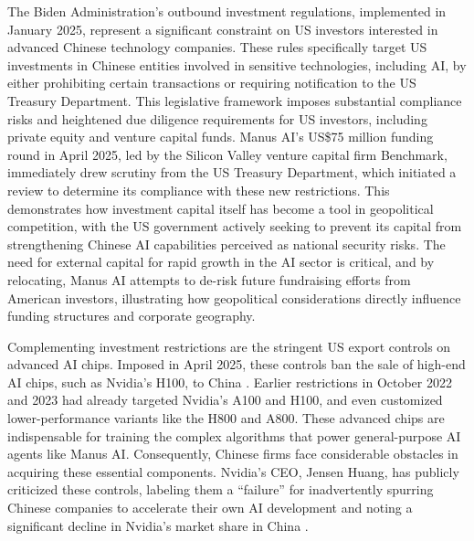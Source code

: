 The Biden Administration's outbound investment regulations, implemented in January 2025, represent a significant constraint on US investors interested in advanced Chinese technology companies.
These rules specifically target US investments in Chinese entities involved in sensitive technologies, including AI, by either prohibiting certain transactions or requiring notification to the US Treasury Department.
This legislative framework imposes substantial compliance risks and heightened due diligence requirements for US investors, including private equity and venture capital funds.
Manus AI's US\$75 million funding round in April 2025, led by the Silicon Valley venture capital firm Benchmark, immediately drew scrutiny from the US Treasury Department, which initiated a review to determine its compliance with these new restrictions.
This demonstrates how investment capital itself has become a tool in geopolitical competition, with the US government actively seeking to prevent its capital from strengthening Chinese AI capabilities perceived as national security risks.
The need for external capital for rapid growth in the AI sector is critical, and by relocating, Manus AI attempts to de-risk future fundraising efforts from American investors, illustrating how geopolitical considerations directly influence funding structures and corporate geography.

Complementing investment restrictions are the stringent US export controls on advanced AI chips.
Imposed in April 2025, these controls ban the sale of high-end AI chips, such as Nvidia's H100, to China \cite{cna_manus_relocates}.
Earlier restrictions in October 2022 and 2023 had already targeted Nvidia's A100 and H100, and even customized lower-performance variants like the H800 and A800.
These advanced chips are indispensable for training the complex algorithms that power general-purpose AI agents like Manus AI.
Consequently, Chinese firms face considerable obstacles in acquiring these essential components.
Nvidia's CEO, Jensen Huang, has publicly criticized these controls, labeling them a ``failure'' for inadvertently spurring Chinese companies to accelerate their own AI development and noting a significant decline in Nvidia's market share in China \cite{timesofindia_nvidia_china_chip, ainvest_nvidia_balancing}.

